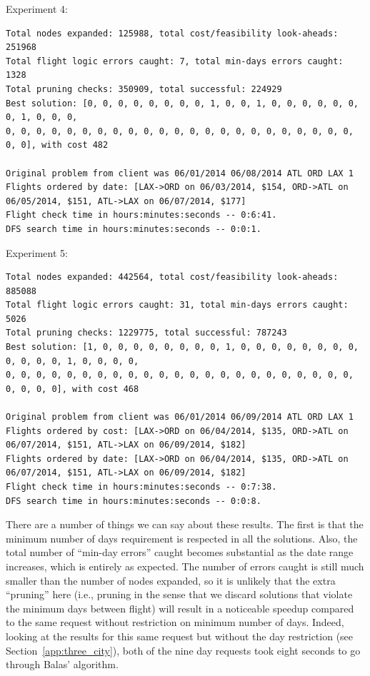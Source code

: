 \documentclass{article}
\begin{document}
Experiment 4:

\scriptsize
\begin{verbatim}
Total nodes expanded: 125988, total cost/feasibility look-aheads: 251968
Total flight logic errors caught: 7, total min-days errors caught: 1328
Total pruning checks: 350909, total successful: 224929
Best solution: [0, 0, 0, 0, 0, 0, 0, 0, 1, 0, 0, 1, 0, 0, 0, 0, 0, 0, 0, 1, 0, 0, 0,
0, 0, 0, 0, 0, 0, 0, 0, 0, 0, 0, 0, 0, 0, 0, 0, 0, 0, 0, 0, 0, 0, 0, 0, 0], with cost 482

Original problem from client was 06/01/2014 06/08/2014 ATL ORD LAX 1
Flights ordered by date: [LAX->ORD on 06/03/2014, $154, ORD->ATL on 06/05/2014, $151, ATL->LAX on 06/07/2014, $177]
Flight check time in hours:minutes:seconds -- 0:6:41.
DFS search time in hours:minutes:seconds -- 0:0:1.
\end{verbatim}
\normalsize

Experiment 5:

\scriptsize
\begin{verbatim}
Total nodes expanded: 442564, total cost/feasibility look-aheads: 885088
Total flight logic errors caught: 31, total min-days errors caught: 5026
Total pruning checks: 1229775, total successful: 787243
Best solution: [1, 0, 0, 0, 0, 0, 0, 0, 0, 1, 0, 0, 0, 0, 0, 0, 0, 0, 0, 0, 0, 0, 1, 0, 0, 0, 0,
0, 0, 0, 0, 0, 0, 0, 0, 0, 0, 0, 0, 0, 0, 0, 0, 0, 0, 0, 0, 0, 0, 0, 0, 0, 0, 0], with cost 468

Original problem from client was 06/01/2014 06/09/2014 ATL ORD LAX 1
Flights ordered by cost: [LAX->ORD on 06/04/2014, $135, ORD->ATL on 06/07/2014, $151, ATL->LAX on 06/09/2014, $182]
Flights ordered by date: [LAX->ORD on 06/04/2014, $135, ORD->ATL on 06/07/2014, $151, ATL->LAX on 06/09/2014, $182]
Flight check time in hours:minutes:seconds -- 0:7:38.
DFS search time in hours:minutes:seconds -- 0:0:8.
\end{verbatim}
\normalsize

There are a number of things we can say about these results. The first is that the minimum number of days requirement is respected in all the
solutions. Also, the total number of ``min-day errors'' caught becomes substantial as the date range increases, which is entirely as expected.  The
number of errors caught is still much smaller than the number of nodes expanded, so it is unlikely that the extra ``pruning'' here (i.e., pruning in
the sense that we discard solutions that violate the minimum days between flight) will result in a noticeable speedup compared to the same request
without restriction on minimum number of days. Indeed, looking at the results for this same request but without the day restriction (see
Section~\ref{app:three_city}), both of the nine day requests took eight seconds to go through Balas' algorithm.
\end{document}
